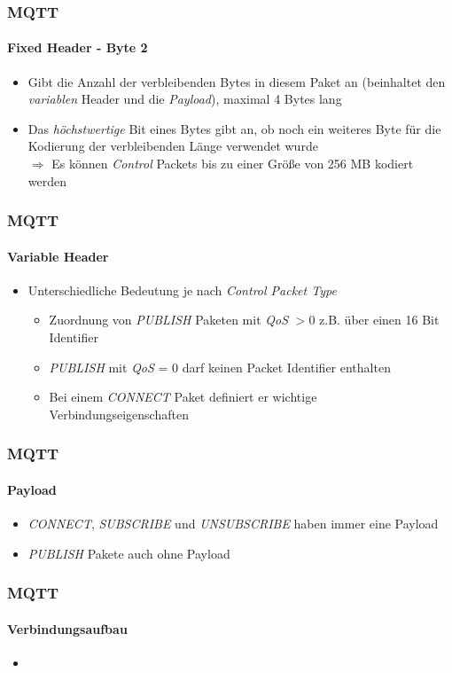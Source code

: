 \documentclass{beamer}
\begin{document}
\begin{frame}
\frametitle{MQTT}
\framesubtitle{Fixed Header - Byte 2}
\begin{itemize}
	\item Gibt die Anzahl der verbleibenden Bytes in diesem Paket an (beinhaltet den \textit{variablen} Header und die \textit{Payload}), maximal 4 Bytes lang
	\item Das \textit{höchstwertige} Bit eines Bytes gibt an, ob noch ein weiteres Byte für die Kodierung der verbleibenden Länge verwendet wurde\\
	$\Rightarrow$ Es können \textit{Control} Packets bis zu einer Größe von 256 MB kodiert werden
\end{itemize}

\end{frame}

\begin{frame}

\frametitle{MQTT}
\framesubtitle{Variable Header}
\begin{itemize}
	\item Unterschiedliche Bedeutung je nach \textit{Control Packet Type}
	\begin{itemize}
		\item Zuordnung von \textit{PUBLISH} Paketen mit \textit{QoS} $> 0$ z.B. über einen 16 Bit Identifier
		\item \textit{PUBLISH} mit \textit{QoS} = $0$ darf keinen Packet Identifier enthalten
		\item Bei einem \textit{CONNECT} Paket definiert er wichtige Verbindungseigenschaften
	\end{itemize}
\end{itemize}

\end{frame}

\begin{frame}

\frametitle{MQTT}
\framesubtitle{Payload}
\begin{itemize}
	\item \textit{CONNECT}, \textit{SUBSCRIBE} und \textit{UNSUBSCRIBE} haben immer eine Payload
	\item \textit{PUBLISH} Pakete auch ohne Payload
\end{itemize}

\end{frame}

\begin{frame}

\frametitle{MQTT}
\framesubtitle{Verbindungsaufbau}
\begin{itemize}
	\item 
\end{itemize}

\end{frame}
\end{document}

